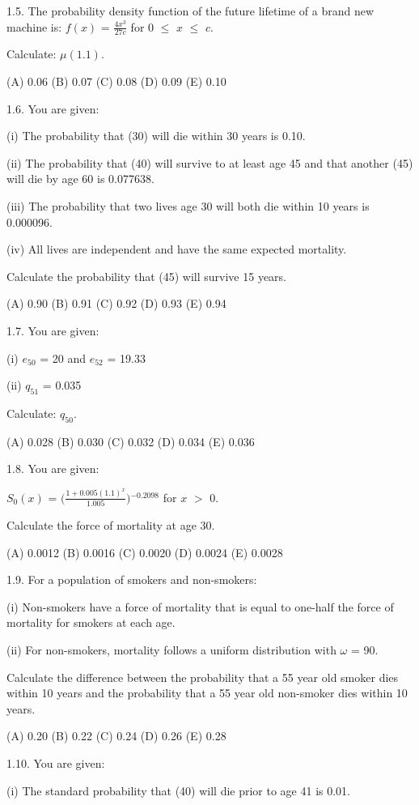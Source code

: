 \documentclass[]{book}
\begin{document}
1.5. The probability density function of the future lifetime of a brand
new machine is: \(f(x)\) = \(\frac{4x^3}{27c}\) for 0 \(\le\) \(x\)
\(\le\) \(c\).

Calculate: \(\mu(1.1)\).

(A) 0.06 (B) 0.07 (C) 0.08 (D) 0.09 (E) 0.10

1.6. You are given:

(i) The probability that (30) will die within 30 years is 0.10.

(ii) The probability that (40) will survive to at least age 45 and that
another (45) will die by age 60 is 0.077638.

(iii) The probability that two lives age 30 will both die within 10
years is 0.000096.

(iv) All lives are independent and have the same expected mortality.

Calculate the probability that (45) will survive 15 years.

(A) 0.90 (B) 0.91 (C) 0.92 (D) 0.93 (E) 0.94

1.7. You are given:

(i) \(e_{50}\) = 20 and \(e_{52}\) = 19.33

(ii) \(q_{51}\) = 0.035

Calculate: \(q_{50}\).

(A) 0.028 (B) 0.030 (C) 0.032 (D) 0.034 (E) 0.036

1.8. You are given:

\(S_0(x)\) = \(\Big(\frac{1 + 0.005(1.1)^x}{1.005}\Big)\)\(^{-0.2098}\)
for \(x\) \(>\) 0.

Calculate the force of mortality at age 30.

(A) 0.0012 (B) 0.0016 (C) 0.0020 (D) 0.0024 (E) 0.0028

1.9. For a population of smokers and non-smokers:

(i) Non-smokers have a force of mortality that is equal to one-half the
force of mortality for smokers at each age.

(ii) For non-smokers, mortality follows a uniform distribution with
\(\omega\) = 90.

Calculate the difference between the probability that a 55 year old
smoker dies within 10 years and the probability that a 55 year old
non-smoker dies within 10 years.

(A) 0.20 (B) 0.22 (C) 0.24 (D) 0.26 (E) 0.28

1.10. You are given:

(i) The standard probability that (40) will die prior to age 41 is 0.01.
\end{document}
